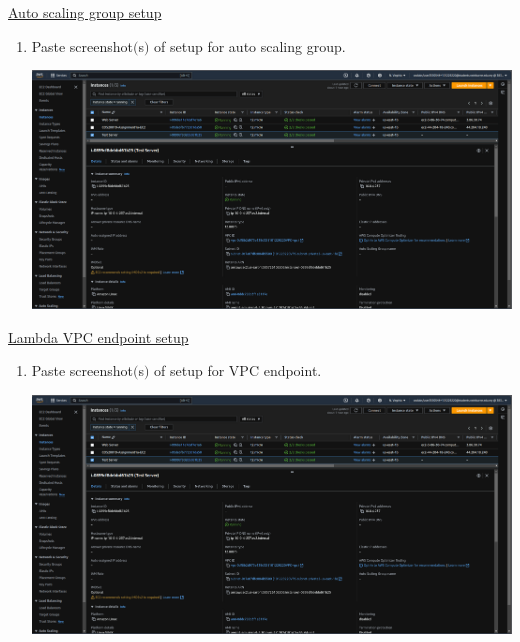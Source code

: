 \documentclass[11pt]{article}
\begin{document}
\noindent\underline{Auto scaling group setup}

\vspace{0.01cm}

\begin{enumerate}[resume]
    \item Paste screenshot$($s$)$ of setup for auto scaling group. \\
    \vspace{-0.02mm}

    {\centering
    \includegraphics[width=5.8in]{pics/40.png}
    }    
        
\end{enumerate}


\noindent\underline{Lambda VPC endpoint setup}

\vspace{0.01cm}

\begin{enumerate}[resume]
    \item Paste screenshot$($s$)$ of setup for VPC endpoint. \\
    \vspace{-0.02mm}

    {\centering
    \includegraphics[width=5.8in]{pics/40.png}
    }    
        
\end{enumerate}
\end{document}
